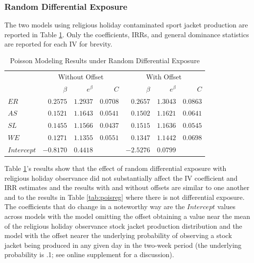 \documentclass[ShortAfour,times,sageapa]{sagej}
\begin{document}
		\subsubsection{Random Differential Exposure}
		
	The two models using religious holiday contaminated sport jacket production are reported in Table \ref{tab:unexp}.
	Only the coefficients, IRRs, and general dominance statistics are reported for each IV for brevity.
		
	\begin{table}[h!]
		\centering
		\caption{\centering Poisson Modeling Results under Random Differential Exposure}
		\begin{tabular}{l|rrrrrr}
			\toprule
			\multicolumn{1}{l}{} & \multicolumn{3}{c}{Without Offset} & \multicolumn{3}{c}{With Offset} \\ 
			\cmidrule(lr){2-4} \cmidrule(lr){5-7}
			\multicolumn{1}{l}{} & $\beta$ & $e^{\beta}$ & $C$ & $\beta$ & $e^{\beta}$ & $C$ \\ 
			\midrule
			$ER$ & $0.2575$ & $1.2937$ & $0.0708$ & $0.2657$ & $1.3043$ & $0.0863$ \\ 
			$AS$ & $0.1521$ & $1.1643$ & $0.0541$ & $0.1502$ & $1.1621$ & $0.0641$ \\ 
			$SL$ & $0.1455$ & $1.1566$ & $0.0437$ & $0.1515$ & $1.1636$ & $0.0545$ \\ 
			$WE$ & $0.1271$ & $1.1355$ & $0.0551$ & $0.1347$ & $1.1442$ & $0.0698$ \\ 
			$Intercept$ & $-0.8170$ & $0.4418$ & & $-2.5276$ & $0.0799$ & \\ 
			\bottomrule
		\end{tabular}
	\label{tab:unexp}
	\end{table}
	
	Table \ref{tab:unexp}'s results show that the effect of random differential exposure with religious holiday observance did not substantially affect the IV coefficient and IRR estimates and the results with and without offsets are similar to one another and to the results in Table \ref{tab:poisreg} where there is not differential exposure.
	The coefficients that do change in a noteworthy way are the $Intercept$ values across models with the model omitting the offset obtaining a value near the mean of the religious holiday observance stock jacket production distribution and the model with the offset nearer the underlying probability of observing a stock jacket being produced in any given day in the two-week period (the underlying probability is .1; see online supplement for a discussion).
	
\end{document}
